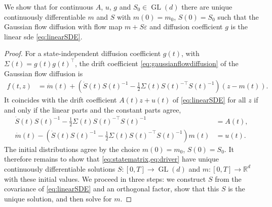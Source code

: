 \documentclass{article} %
\newcommand{\postdrift}{f}
\newcommand{\vol}{g}
\newcommand{\gl}{\operatorname{GL}}
\newcommand{\reals}{\mathbb{R}}
\begin{document}
We show that for continuous $A$, $u$, $\vol$ and $S_0 \in \gl(d)$ there are unique continuously differentiable $m$ and $S$ with $m(0) = m_0$, $S(0) = S_0$ such that the Gaussian flow diffusion with flow map $m + S \varepsilon$ and diffusion coefficient $\vol$ is the linear \gls{sde} \cref{eq:linearSDE}.

\begin{proof}
For a state-independent diffusion coefficient $\vol(t)$, with $\Sigma(t) = \vol(t) \vol(t)^\top$, the drift coefficient \cref{eq:gaussianflowdiffusion} of the Gaussian flow diffusion is
\begin{align*}
    \postdrift(t, z) &= \dot m(t)+\left(\dot S(t)S(t)^{-1} -\frac{1}{2}\Sigma(t) S(t)^{-\top}S(t)^{-1}\right)(z-m(t)).
\end{align*}
It coincides with the drift coefficient $A(t) z + u(t)$ of \cref{eq:linearSDE} for all $z$ if and only if the linear parts and the constant parts agree,
\begin{align}
    \dot S(t)S(t)^{-1} -\frac{1}{2}\Sigma(t) S(t)^{-\top}S(t)^{-1} &= A(t), \label{eq:statematrix}\\
    \dot m(t) - \left(\dot S(t)S(t)^{-1} -\frac{1}{2}\Sigma(t) S(t)^{-\top}S(t)^{-1}\right) m(t) &= u(t). \label{eq:driver}
\end{align}
The initial distributions agree by the choice $m(0) = m_0$, $S(0) = S_0$. It therefore remains to show that \cref{eq:statematrix,eq:driver} have unique continuously differentiable solutions $S : [0, T] \to \gl(d)$ and $m : [0, T] \to \reals^d$ with these initial values. We proceed in three steps: we construct $S$ from the covariance of \cref{eq:linearSDE} and an orthogonal factor, show that this $S$ is the unique solution, and then solve for $m$.


\end{proof}
\end{document}
